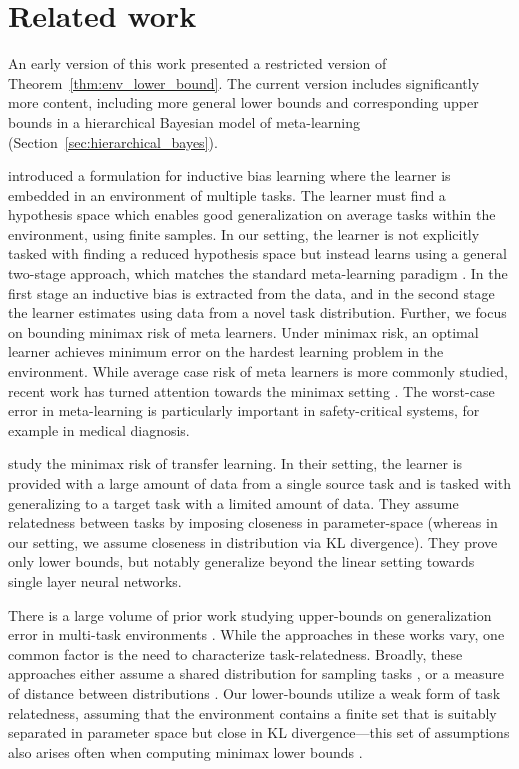 \section{Related work}

An early version of this work \citep{lucas2019information} presented a restricted version of Theorem~\ref{thm:env_lower_bound}. The current version includes significantly more content, including more general lower bounds and corresponding upper bounds in a hierarchical Bayesian model of meta-learning (Section~\ref{sec:hierarchical_bayes}).

\citet{baxter2000model} introduced a formulation for inductive bias learning where the learner is embedded in an environment of multiple tasks. The learner must find a hypothesis space which enables good generalization on average tasks within the environment, using finite samples. In our setting, the learner is not explicitly tasked with finding a reduced hypothesis space but instead learns
using a general two-stage approach, which matches the standard meta-learning paradigm \citep{vilalta2002perspective}. In the first stage an inductive bias is extracted from the data, and in the second stage the learner estimates using data from a novel task distribution. Further, we focus on bounding minimax risk of meta learners. Under minimax risk, an optimal learner achieves minimum error on the hardest learning problem in the environment. While average case risk of meta learners is more commonly studied, recent work has turned attention towards the minimax setting \citep{pmlr-v75-kpotufe18a, NIPS2019_9179, hanneke2020no, kalan2020minimax, mehta2012minimax}. The worst-case error 
in meta-learning is particularly important in safety-critical systems, for example in medical diagnosis.

\citet{kalan2020minimax} study the minimax risk of transfer learning. In their setting, the learner is provided with a large amount of data from a single source task and is tasked with generalizing to a target task with a limited amount of data. They assume relatedness between tasks by imposing closeness in parameter-space (whereas in our setting, we assume closeness in distribution via KL divergence). They prove only lower bounds, but notably generalize beyond the linear setting towards single layer neural networks.

There is a large volume of prior work studying upper-bounds on generalization error in multi-task environments \citep{ben2008notion, ben2010theory, pentina2014pac, amit2017meta, mehta2012minimax}. While the approaches in these works vary, one common factor is the need to characterize task-relatedness. Broadly, these approaches either assume a shared distribution for sampling tasks \citep{baxter2000model, pentina2014pac, amit2017meta}, or a measure of distance between distributions \citep{ben2008notion, ben2010theory, mohri2012new}. Our lower-bounds utilize a weak form of task relatedness, assuming that the environment contains a finite set that is suitably separated in parameter space but close in KL divergence---this set of assumptions also arises often when computing \iid minimax lower bounds \citep{loh2017lower}.

